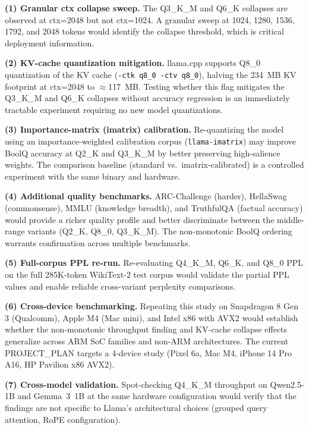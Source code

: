 \documentclass[conference]{IEEEtran}
\begin{document}
\textbf{(1) Granular ctx collapse sweep.}
The Q3\_K\_M and Q6\_K collapses are observed at ctx=2048 but not ctx=1024.
A granular sweep at 1024, 1280, 1536, 1792, and 2048 tokens would identify
the collapse threshold, which is critical deployment information.

\textbf{(2) KV-cache quantization mitigation.}
llama.cpp supports Q8\_0 quantization of the KV cache
(\texttt{-ctk q8\_0 -ctv q8\_0}), halving the 234~MB KV footprint at ctx=2048
to ${\approx}$117~MB. Testing whether this flag mitigates the Q3\_K\_M and
Q6\_K collapses without accuracy regression is an immediately tractable
experiment requiring no new model quantizations.

\textbf{(3) Importance-matrix (imatrix) calibration.}
Re-quantizing the model using an importance-weighted calibration corpus
(\texttt{llama-imatrix}) may improve BoolQ accuracy at Q2\_K and Q3\_K\_M
by better preserving high-salience weights. The comparison baseline (standard
vs.\ imatrix-calibrated) is a controlled experiment with the same binary and
hardware.

\textbf{(4) Additional quality benchmarks.}
ARC-Challenge (harder), HellaSwag (commonsense), MMLU (knowledge breadth),
and TruthfulQA (factual accuracy) would provide a richer quality profile and
better discriminate between the middle-range variants (Q2\_K, Q8\_0,
Q3\_K\_M). The non-monotonic BoolQ ordering warrants confirmation across
multiple benchmarks.

\textbf{(5) Full-corpus PPL re-run.}
Re-evaluating Q4\_K\_M, Q6\_K, and Q8\_0 PPL on the full 285K-token
WikiText-2 test corpus would validate the partial PPL values and enable
reliable cross-variant perplexity comparisons.

\textbf{(6) Cross-device benchmarking.}
Repeating this study on Snapdragon 8 Gen 3 (Qualcomm), Apple M4 (Mac mini),
and Intel x86 with AVX2 would establish whether the non-monotonic throughput
finding and KV-cache collapse effects generalize across ARM SoC families and
non-ARM architectures. The current PROJECT\_PLAN targets a 4-device study
(Pixel 6a, Mac M4, iPhone 14 Pro A16, HP Pavilion x86 AVX2).

\textbf{(7) Cross-model validation.}
Spot-checking Q4\_K\_M throughput on Qwen2.5-1B and Gemma~3~1B at the same
hardware configuration would verify that the findings are not specific to
Llama's architectural choices (grouped query attention, RoPE configuration).

\end{document}
